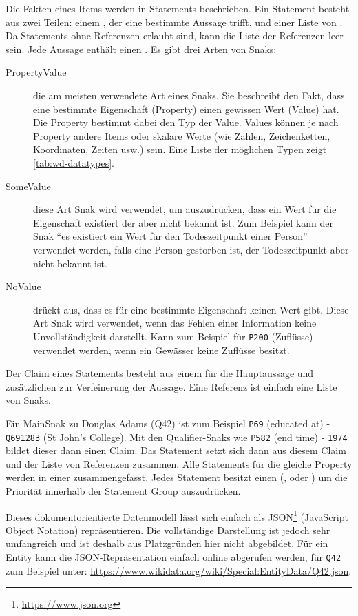 Die Fakten eines Items werden in Statements beschrieben.
Ein Statement besteht aus zwei Teilen: einem , der eine bestimmte Aussage trifft, und einer Liste von .
Da Statements ohne Referenzen erlaubt sind, kann die Liste der Referenzen leer sein.
Jede Aussage enthält einen .
Es gibt drei Arten von Snaks:
\begin{description}
\item[PropertyValue] die am meisten verwendete Art eines Snaks. Sie beschreibt den Fakt, dass eine bestimmte Eigenschaft (Property) einen gewissen Wert (Value) hat. Die Property bestimmt dabei den Typ der Value. Values können je nach Property andere Items oder skalare Werte (wie Zahlen, Zeichenketten, Koordinaten, Zeiten usw.) sein. Eine Liste der möglichen Typen zeigt \cref{tab:wd-datatypes}.
\item[SomeValue] diese Art Snak wird verwendet, um auszudrücken, dass ein Wert für die Eigenschaft existiert der aber nicht bekannt ist. Zum Beispiel kann der Snak "`es existiert ein Wert für den Todeszeitpunkt einer Person"' verwendet werden, falls eine Person gestorben ist, der Todeszeitpunkt aber nicht bekannt ist.
\item[NoValue] drückt aus, dass es für eine bestimmte Eigenschaft keinen Wert gibt. Diese Art Snak wird verwendet, wenn das Fehlen einer Information keine Unvollständigkeit darstellt. Kann zum Beispiel für \verb|P200| (Zuflüsse) verwendet werden, wenn ein Gewässer keine Zuflüsse besitzt. 
\end{description}
Der Claim eines Statements besteht aus einem  für die Hauptaussage und zusätzlichen  zur Verfeinerung der Aussage.
Eine Referenz ist einfach eine Liste von Snaks. 

Ein MainSnak zu Douglas Adams (Q42) ist zum Beispiel \verb|P69| (educated at) - \verb|Q691283| (St John's College).
Mit den Qualifier-Snaks wie \verb|P582| (end time) - \verb|1974| bildet dieser dann einen Claim.
Das Statement setzt sich dann aus diesem Claim und der Liste von Referenzen zusammen.
Alle Statements für die gleiche Property werden in einer  zusammengefasst.
Jedes Statement besitzt einen  (,  oder ) um die Priorität innerhalb der Statement Group auszudrücken.

Dieses dokumentorientierte Datenmodell lässt sich einfach als JSON\footnote{\url{https://www.json.org}} (JavaScript Object Notation) repräsentieren.
Die vollständige Darstellung ist jedoch sehr umfangreich und ist deshalb aus Platzgründen hier nicht abgebildet.
Für ein Entity kann die JSON-Repräsentation einfach online abgerufen werden, für \verb|Q42| zum Beispiel unter: \url{https://www.wikidata.org/wiki/Special:EntityData/Q42.json}.

